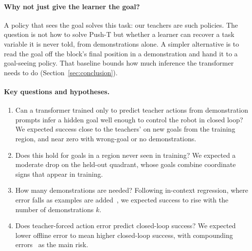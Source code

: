\paragraph{Why not just give the learner the goal?} A policy that sees the goal solves this task: our teachers are such policies.
The question is not how to solve Push-T but whether a learner can recover a task variable it is never told, from demonstrations
alone. A simpler alternative is to read the goal off the block's final position in a demonstration and hand it to a goal-seeing
policy. That baseline bounds how much inference the transformer needs to do (Section~\ref{sec:conclusion}).

\paragraph{Key questions and hypotheses.} %
\begin{enumerate}
  \item[(i)] Can a transformer trained only to predict teacher actions from demonstration prompts infer a hidden goal well enough to
    control the robot in closed loop? We expected success close to the teachers' on new goals from the training region, and near
    zero with wrong-goal or no demonstrations.
  \item[(ii)] Does this hold for goals in a region never seen in training? We expected a moderate drop on the held-out quadrant,
    whose goals combine coordinate signs that appear in training.
  \item[(iii)] How many demonstrations are needed? Following in-context regression, where error falls as examples are
    added~\cite{garg2022can}, we expected success to rise with the number of demonstrations $k$.
  \item[(iv)] Does teacher-forced action error predict closed-loop success? We expected lower offline error to mean higher
    closed-loop success, with compounding errors~\cite{ross2010efficient} as the main risk.
\end{enumerate}

